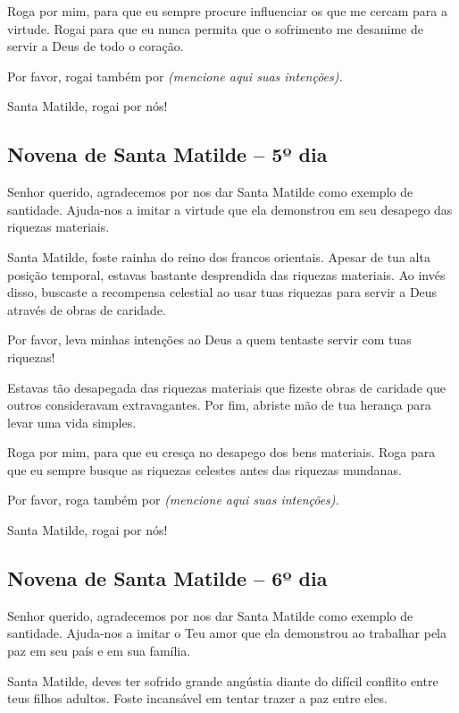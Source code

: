 Roga por mim, para que eu sempre procure influenciar os que me cercam para a virtude. Rogai para que eu nunca permita que o sofrimento me desanime de servir a Deus de todo o coração.

Por favor, rogai também por \textit{(mencione aqui suas intenções).}

Santa Matilde, rogai por nós!


\subsection{Novena de Santa Matilde – 5º dia}



Senhor querido, agradecemos por nos dar Santa Matilde como exemplo de santidade. Ajuda-nos a imitar a virtude que ela demonstrou em seu desapego das riquezas materiais.

Santa Matilde, foste rainha do reino dos francos orientais. Apesar de tua alta posição temporal, estavas bastante desprendida das riquezas materiais. Ao invés disso, buscaste a recompensa celestial ao usar tuas riquezas para servir a Deus através de obras de caridade.

Por favor, leva minhas intenções ao Deus a quem tentaste servir com tuas riquezas!

Estavas tão desapegada das riquezas materiais que fizeste obras de caridade que outros consideravam extravagantes. Por fim, abriste mão de tua herança para levar uma vida simples.

Roga por mim, para que eu cresça no desapego dos bens materiais. Roga para que eu sempre busque as riquezas celestes antes das riquezas mundanas.

Por favor, roga também por \textit{(mencione aqui suas intenções).}

Santa Matilde, rogai por nós!


\subsection{Novena de Santa Matilde – 6º dia}



Senhor querido, agradecemos por nos dar Santa Matilde como exemplo de santidade. Ajuda-nos a imitar o Teu amor que ela demonstrou ao trabalhar pela paz em seu país e em sua família.

Santa Matilde, deves ter sofrido grande angústia diante do difícil conflito entre teus filhos adultos. Foste incansável em tentar trazer a paz entre eles.

